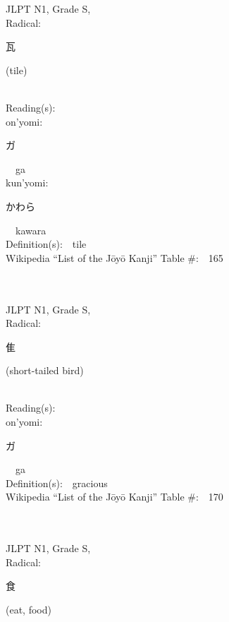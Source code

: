 \begin{multicols}{2}
{JLPT N1, Grade S, \\Radical:\ \ {\begin{CJK}{UTF8}{min} 瓦 \end{CJK}} (tile) } \\
Reading(s):\ \ \\
{\hspace*{1em}}on'yomi:\ \ \\
{\hspace*{2em}}{\begin{CJK}{UTF8}{min} ガ \end{CJK}}\ \ ga\ \ \\
{\hspace*{1em}}kun'yomi:\ \ \\
{\hspace*{2em}}{\begin{CJK}{UTF8}{min} かわら \end{CJK}}\ \ kawara\ \ \\
Definition(s):\ \ tile \\
Wikipedia ``List of the J\=oy\=o Kanji'' Table \#:\ \ 165 \\
\ \ \\
{\fontsize{34pt}{40pt}  }\ \ \\
{JLPT N1, Grade S, \\Radical:\ \ {\begin{CJK}{UTF8}{min} 隹 \end{CJK}} (short-tailed bird) } \\
Reading(s):\ \ \\
{\hspace*{1em}}on'yomi:\ \ \\
{\hspace*{2em}}{\begin{CJK}{UTF8}{min} ガ \end{CJK}}\ \ ga\ \ \\
Definition(s):\ \ gracious \\
Wikipedia ``List of the J\=oy\=o Kanji'' Table \#:\ \ 170 \\
\ \ \\
{\fontsize{34pt}{40pt}  }\ \ \\
{JLPT N1, Grade S, \\Radical:\ \ {\begin{CJK}{UTF8}{min} 食 \end{CJK}} (eat, food) } \\

\end{multicols}
